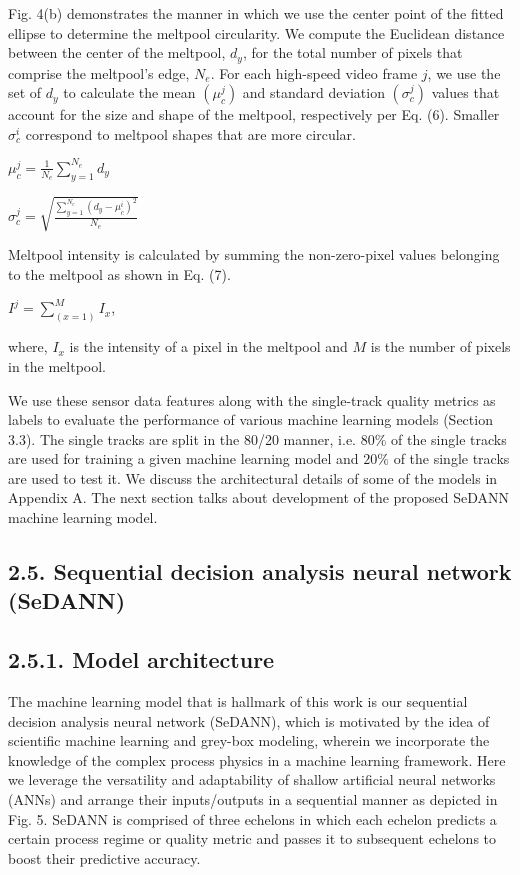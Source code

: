 \documentclass[10pt]{article}
\begin{document}
Fig. 4(b) demonstrates the manner in which we use the center point of the fitted ellipse to determine the meltpool circularity. We compute the Euclidean distance between the center of the meltpool, $d_{y}$, for the total number of pixels that comprise the meltpool's edge, $N_{e}$. For each high-speed video frame $j$, we use the set of $d_{y}$ to calculate the mean $\left(\mu_{c}^{j}\right)$ and standard deviation $\left(\sigma_{c}^{j}\right)$ values that account for the size and shape of the meltpool, respectively per Eq. (6). Smaller $\sigma_{c}^{i}$ correspond to meltpool shapes that are more circular.

$\mu_{c}^{j}=\frac{1}{N_{e}} \sum_{y=1}^{N_{e}} d_{y}$

$\sigma_{c}^{j}=\sqrt{\frac{\sum_{y=1}^{N_{e}}\left(d_{y}-\mu_{c}^{i}\right)^{2}}{N_{e}}}$

Meltpool intensity is calculated by summing the non-zero-pixel values belonging to the meltpool as shown in Eq. (7).

$I^{j}=\sum_{(x=1)}^{M} I_{x}$,

where, $I_{x}$ is the intensity of a pixel in the meltpool and $M$ is the number of pixels in the meltpool.

We use these sensor data features along with the single-track quality metrics as labels to evaluate the performance of various machine learning models (Section 3.3). The single tracks are split in the 80/20 manner, i.e. $80 \%$ of the single tracks are used for training a given machine learning model and $20 \%$ of the single tracks are used to test it. We discuss the architectural details of some of the models in Appendix A. The next section talks about development of the proposed SeDANN machine learning model.

\subsection*{2.5. Sequential decision analysis neural network (SeDANN)}
\subsection*{2.5.1. Model architecture}
The machine learning model that is hallmark of this work is our sequential decision analysis neural network (SeDANN), which is motivated by the idea of scientific machine learning and grey-box modeling, wherein we incorporate the knowledge of the complex process physics in a machine learning framework. Here we leverage the versatility and adaptability of shallow artificial neural networks (ANNs) and arrange their inputs/outputs in a sequential manner as depicted in Fig. 5. SeDANN is comprised of three echelons in which each echelon predicts a certain process regime or quality metric and passes it to subsequent echelons to boost their predictive accuracy.
\end{document}
